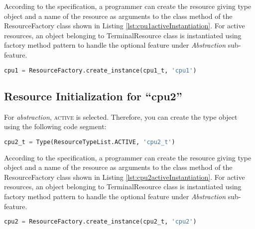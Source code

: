 \documentclass[]{scrartcl}
\begin{document}
        
According to the specification, a programmer can create the resource giving type object and a name of the resource as arguments to the class method of the
ResourceFactory class shown in Listing \ref{lst:cpu1activeInstantiation}. For active resources, an object belonging to \textsf{TerminalResource} class is instantiated
using factory method pattern to handle the optional feature under \emph{Abstraction} sub-feature.


\begin{lstlisting}[language=Python, frame=single, label={lst:cpu1activeInstantiation}, caption={Active resource instantiation using ResourceFactory class}]
cpu1 = ResourceFactory.create_instance(cpu1_t, 'cpu1')
\end{lstlisting}
        

\subsection{Resource Initialization for ``\textsf{cpu2}''}
        
For \emph{abstraction}, \textsc{active} is selected. Therefore, you can create the type object using the following code segment:

\begin{lstlisting}[language=Python, frame=single, label={lst:activeType}, caption={Active resource type object instantiation}]
cpu2_t = Type(ResourceTypeList.ACTIVE, 'cpu2_t')
\end{lstlisting}
        
        
According to the specification, a programmer can create the resource giving type object and a name of the resource as arguments to the class method of the
ResourceFactory class shown in Listing \ref{lst:cpu2activeInstantiation}. For active resources, an object belonging to \textsf{TerminalResource} class is instantiated
using factory method pattern to handle the optional feature under \emph{Abstraction} sub-feature.


\begin{lstlisting}[language=Python, frame=single, label={lst:cpu2activeInstantiation}, caption={Active resource instantiation using ResourceFactory class}]
cpu2 = ResourceFactory.create_instance(cpu2_t, 'cpu2')
\end{lstlisting}
        
\end{document}
